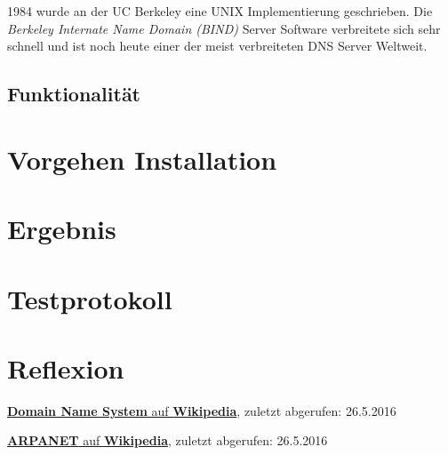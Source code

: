 \documentclass[11pt,twoside,a4paper]{article}
\begin{document}
1984 wurde an der UC Berkeley eine UNIX Implementierung geschrieben. Die \textit{Berkeley Internate Name Domain (BIND)} Server Software verbreitete sich sehr schnell und ist noch heute einer der meist verbreiteten DNS Server Weltweit. 

\subsection{Funktionalität}



\section{Vorgehen Installation}


\section{Ergebnis}

\section{Testprotokoll}


\section{Reflexion}



\begin{thebibliography}{9}

 \href{https://en.wikipedia.org/wiki/Domain_Name_System}{\textbf{Domain Name System} auf \textbf{Wikipedia}}, zuletzt abgerufen: 26.5.2016

 \href{https://en.wikipedia.org/wiki/Domain_Name_System}{\textbf{ARPANET} auf \textbf{Wikipedia}}, zuletzt abgerufen: 26.5.2016
    
\end{thebibliography}
\end{document}
